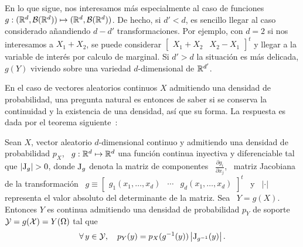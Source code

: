 En lo  que sigue, nos interesamos  m\'as especialmente al caso  de funciones $g:
(\mathbb{R}^d ,  \mathcal{B}(\mathbb{R}^d)) \mapsto (\mathbb{R}^d ,  \mathcal{B}(\mathbb{R}^d))$.  De hecho,  si $d' <
d$,   es    sencillo   llegar   al   caso    considerado   a\~nandiendo   $d-d'$
transformaciones. Por ejemplo, con $d = 2$  si nos interesamos a $X_1 + X_2$, se
puede considerar $\begin{bmatrix} X_1 + X_2 & X_2 - X_1\end{bmatrix}^t$ y llegar
a la variable de  inter\'es por calculo de marginal. Si $d'  > d$ la situaci\'on
es  m\'as  delicada,  $g(Y)$  viviendo  sobre una  variedad  $d$-dimensional  de
$\mathbb{R}^{d'}$.

En  el caso  de vectores  aleatorios continuos  $X$ admitiendo  una  densidad de
probabilidad,  una pregunta  natural  es entonces  de  saber si  se conserva  la
continuidad y la existencia de una densidad, as\'i que su forma. La respuesta es
dada por el teorema siguiente~\cite{Bre88, JacPro03, AthLah06, Coh13, HogMck13}:
%
\begin{teorema}
  Sean $X$, vector aleatorio  $d$-dimensional continuo y admitiendo una densidad
  de probabilidad  $p_X$, \ $g:\mathbb{R}^d  \mapsto \mathbb{R}^d$ una  funci\'on continua
  inyectiva y diferenciable tal que
 $\left| \operatorname{J}_g \right| > 0$,
 donde $\operatorname{J}_g$ denota la  matriz de componentes \ $\frac{\partial g_i}{\partial
   x_j}$, \ matriz Jacobiana de  la transformaci\'on \ $g \equiv \begin{bmatrix}
   g_1(x_1 , \ldots , x_d) & \cdots & g_d(x_1 , \ldots , x_d) \end{bmatrix}^t$ \
 y \ $|\cdot|$ representa el valor absoluto del determinante de la matriz. Sea \
 $Y = g(X)$.   Entonces $Y$ es continua admitiendo  una densidad de probabilidad
 $p_Y$ de soporte $\mathcal{Y} = g(\mathcal{X}) = Y(\Omega)$ tal que
  \[
  \forall \,  y \in  \mathcal{Y}, \quad p_Y(y)  = p_X(g^{-1}(y))  \left| \operatorname{J}_{g^{-1}}(y)
  \right|.
  \]
\end{teorema}
%
